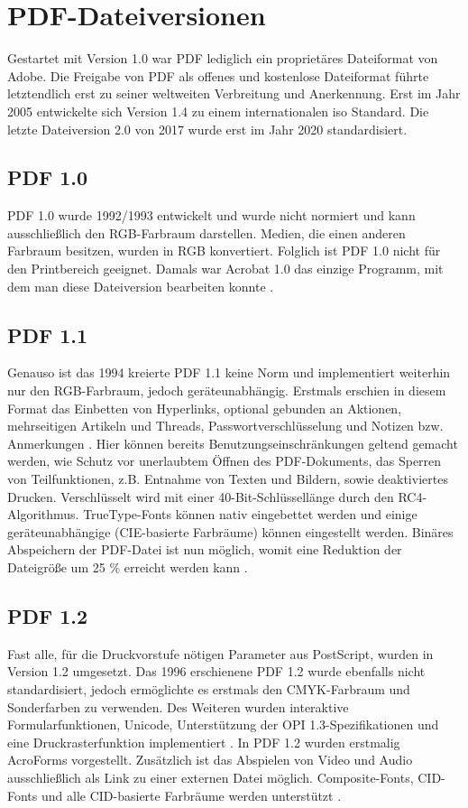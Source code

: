 \section{PDF-Dateiversionen}
Gestartet mit Version 1.0 war PDF lediglich ein proprietäres Dateiformat von Adobe. Die Freigabe von PDF als offenes und kostenlose Dateiformat führte letztendlich erst zu seiner weltweiten Verbreitung und Anerkennung. Erst im Jahr 2005 entwickelte sich Version 1.4 zu einem internationalen \gls{iso} Standard. Die letzte Dateiversion 2.0 von 2017 wurde erst im Jahr 2020 standardisiert.

\subsection{PDF 1.0}
PDF 1.0 wurde 1992/1993 entwickelt und wurde nicht normiert und kann ausschließlich den RGB-Farbraum darstellen. Medien, die einen anderen Farbraum besitzen, wurden in RGB konvertiert. Folglich ist PDF 1.0 nicht für den Printbereich geeignet. Damals war Acrobat 1.0 das einzige Programm, mit dem man diese Dateiversion bearbeiten konnte \cite{proj-consult}. 

\subsection{PDF 1.1}
Genauso ist das 1994 kreierte PDF 1.1 keine Norm und implementiert weiterhin nur den RGB-Farbraum, jedoch geräteunabhängig. Erstmals erschien in diesem Format das Einbetten von Hyperlinks, optional gebunden an Aktionen, mehrseitigen Artikeln und Threads, Passwortverschlüsselung und Notizen bzw. Anmerkungen \cite{proj-consult}. Hier können bereits Benutzungseinschränkungen geltend gemacht werden, wie Schutz vor unerlaubtem Öffnen des PDF-Dokuments, das Sperren von Teilfunktionen, z.B. Entnahme von Texten und Bildern, sowie deaktiviertes Drucken. Verschlüsselt wird mit einer 40-Bit-Schlüssellänge durch den RC4-Algorithmus. TrueType-Fonts können nativ eingebettet werden und einige geräteunabhängige (CIE-basierte Farbräume) können eingestellt werden. Binäres Abspeichern der PDF-Datei ist nun möglich, womit eine Reduktion der Dateigröße um 25 \% erreicht werden kann \cite{schneeberger}.

\subsection{PDF 1.2}
Fast alle, für die Druckvorstufe nötigen Parameter aus PostScript, wurden in Version 1.2 umgesetzt. Das 1996 erschienene PDF 1.2 wurde ebenfalls nicht standardisiert, jedoch ermöglichte es erstmals den CMYK-Farbraum und Sonderfarben zu verwenden. Des Weiteren wurden interaktive Formularfunktionen, Unicode, Unterstützung der OPI 1.3-Spezifikationen und eine Druckrasterfunktion implementiert \cite{proj-consult}. In PDF 1.2 wurden erstmalig AcroForms vorgestellt. Zusätzlich ist das Abspielen von Video und Audio ausschließlich als Link zu einer externen Datei möglich. Composite-Fonts, CID-Fonts und alle CID-basierte Farbräume werden unterstützt \cite{schneeberger}.

